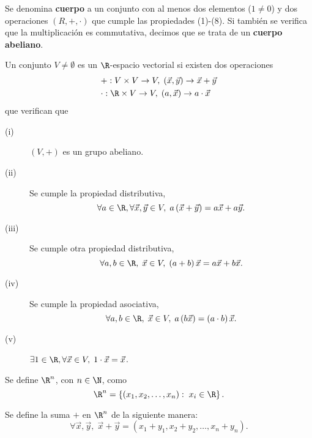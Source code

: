 \begin{fdefinition}[Cuerpo]
\normalfont Se denomina \textbf{cuerpo} a un conjunto con al menos dos elementos ($\displaystyle 1 \neq0 $) y dos operaciones $\displaystyle \left(R, +, \cdot\right) $ que cumple las propiedades (1)-(8). Si también se verifica que la multiplicación es commutativa, decimos que se trata de un \textbf{cuerpo abeliano}. 
\end{fdefinition}

\begin{fdefinition}[]
\normalfont Un conjunto $\displaystyle V \neq \emptyset $ es un $\displaystyle \R $-espacio vectorial si existen dos operaciones 
\[
\begin{split}
	& +: V\times V \to V, \; \left(\vec{x},\vec{y}\right)\to \vec{x} + \vec{y} \\ 
	& \cdot : \R \times V \to V, \; \left(a, \vec{x}\right) \to a \cdot \vec{x}
\end{split}
\]
que verifican que
\begin{description}
\item[(i)] $\displaystyle \left(V, +\right) $ es un grupo abeliano.
\item[(ii)] Se cumple la propiedad distributiva, 
	\[\forall a \in \R, \forall \vec{x}, \vec{y} \in V, \; a\left(\vec{x}+\vec{y}\right) = a\vec{x}+a\vec{y} .\]
\item[(iii)] Se cumple otra propiedad distributiva, 
	\[\forall a, b \in \R, \; \vec{x}\in V, \; \left(a+b\right)\vec{x} = a\vec{x} + b\vec{x}.\]\item[(iv)] Se cumple la propiedad asociativa,
	\[\forall a,b \in \R, \; \vec{x} \in V, \; a\left(b\vec{x}\right) = \left(a\cdot b\right)\vec{x} .\]
\item[(v)] $\displaystyle \exists 1 \in \R, \forall \vec{x} \in V, \; 1 \cdot \vec{x} = \vec{x} $. 
\end{description}
\end{fdefinition}

\begin{fdefinition}[]
\normalfont Se define $\displaystyle \R^{n} $, con $\displaystyle n \in \N $, como
\[\R^{n}= \left\{ \left(x_{1},x_{2}, \ldots, x_{n}\right) : \; x_{i}\in\R\right\}  .\]
\end{fdefinition}

\begin{fdefinition}[]
\normalfont Se define la suma $\displaystyle + $ en $\displaystyle \R^{n} $ de la siguiente manera:
\[\forall \vec{x}, \vec{y}, \; \vec{x} + \vec{y} = \left(x_{1}+y_{1}, x_{2}+y_{2}, \ldots, x_{n}+y_{n}\right) .\]
\end{fdefinition}


